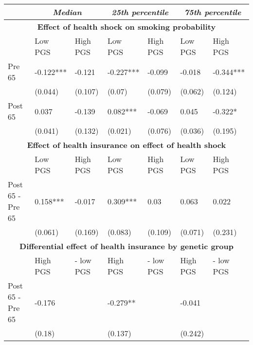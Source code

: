 % 
\begin{tabular}{l| p{2cm}p{2cm}| p{2cm}p{2cm}| p{2cm}p{2cm}}
  & \multicolumn{2}{c}{ \textit{Median}} & \multicolumn{2}{c}{ \textit{25th percentile}} & \multicolumn{2}{c}{ \textit{75th percentile}} \\
 \toprule
  \multicolumn{7}{c}{ \textbf{Effect of health shock on smoking probability}} \\
 \midrule
 & Low PGS & High PGS & Low PGS & High PGS & Low PGS & High PGS \\ 
   \midrule
Pre 65 & -0.122*** & -0.121 & -0.227*** & -0.099 & -0.018 & -0.344*** \\ 
   & (0.044) & (0.107) & (0.07) & (0.079) & (0.062) & (0.124) \\ 
  Post 65 & 0.037 & -0.139 & 0.082*** & -0.069 & 0.045 & -0.322* \\ 
   & (0.041) & (0.132) & (0.021) & (0.076) & (0.036) & (0.195) \\ 
   \toprule \multicolumn{7}{c}{ \textbf{Effect of health insurance on effect of health shock}} \\
 \midrule
 & Low PGS & High PGS & Low PGS & High PGS & Low PGS & High PGS \\ 
   \midrule
Post 65 - Pre 65 & 0.158*** & -0.017 & 0.309*** & 0.03 & 0.063 & 0.022 \\ 
   & (0.061) & (0.169) & (0.083) & (0.109) & (0.071) & (0.231) \\ 
   \toprule \multicolumn{7}{c}{ \textbf{Differential effect of health insurance by genetic group}} \\
 \midrule
 & High PGS  & - low PGS & High PGS  & - low PGS & High PGS  & - low PGS \\ 
   \midrule
Post 65 - Pre 65 & -0.176 &  & -0.279** &  & -0.041 &  \\ 
   & (0.18) &  & (0.137) &  & (0.242) &  \\ 
  \end{tabular}
